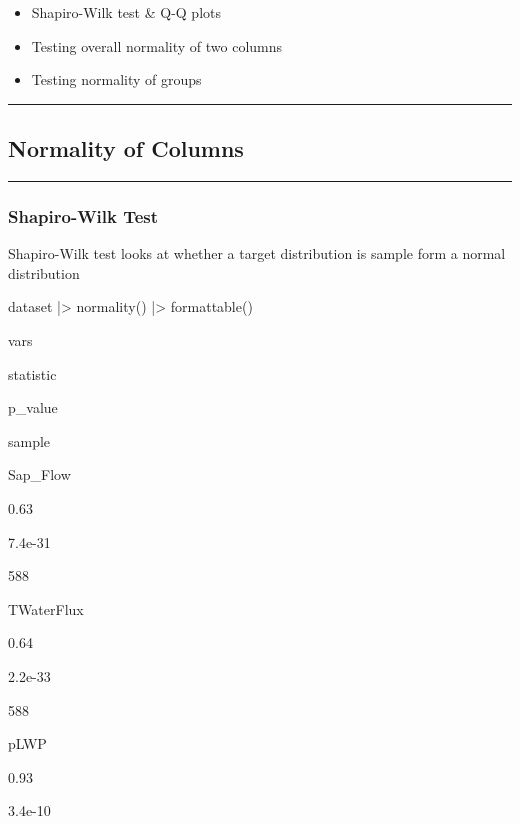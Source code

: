 \documentclass[
  letterpaper,
  DIV=11,
  numbers=noendperiod]{scrreprt}
\newenvironment{Shaded}{\begin{snugshade}}{\end{snugshade}}
\newcommand{\FunctionTok}[1]{\textcolor[rgb]{0.28,0.35,0.67}{#1}}
\newcommand{\NormalTok}[1]{\textcolor[rgb]{0.00,0.23,0.31}{#1}}
\newcommand{\SpecialCharTok}[1]{\textcolor[rgb]{0.37,0.37,0.37}{#1}}
\providecommand{\tightlist}{%
  \setlength{\itemsep}{0pt}\setlength{\parskip}{0pt}}\usepackage{longtable,booktabs,array}
\begin{document}
\begin{itemize}
\tightlist
\item
  Shapiro-Wilk test \& Q-Q plots
\item
  Testing overall normality of two columns
\item
  Testing normality of groups
\end{itemize}

\begin{center}\rule{0.5\linewidth}{0.5pt}\end{center}

\hypertarget{normality-of-columns}{%
\subsection{Normality of Columns}\label{normality-of-columns}}

\begin{center}\rule{0.5\linewidth}{0.5pt}\end{center}

\hypertarget{shapiro-wilk-test}{%
\subsubsection{Shapiro-Wilk Test}\label{shapiro-wilk-test}}

Shapiro-Wilk test looks at whether a target distribution is sample form
a normal distribution

\begin{Shaded}
\begin{Highlighting}[]
\NormalTok{dataset }\SpecialCharTok{|\textgreater{}}
  \FunctionTok{normality}\NormalTok{() }\SpecialCharTok{|\textgreater{}}
  \FunctionTok{formattable}\NormalTok{()}
\end{Highlighting}
\end{Shaded}

vars

statistic

p\_value

sample

Sap\_Flow

0.63

7.4e-31

588

TWaterFlux

0.64

2.2e-33

588

pLWP

0.93

3.4e-10
\end{document}
